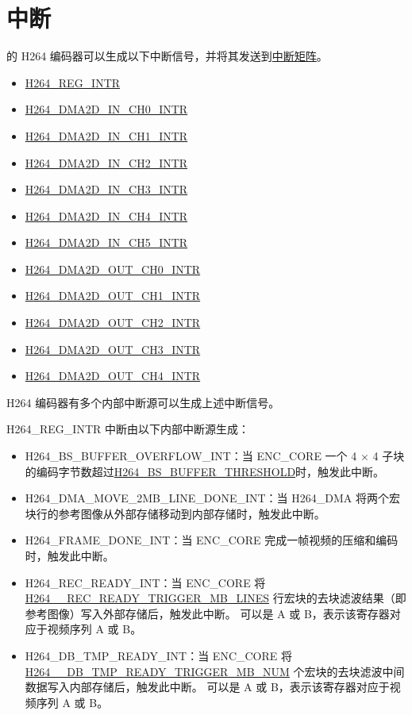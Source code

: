 \documentclass[main\_\_CN.tex]{subfiles}
\begin{document}
\section{中断}
\label{sec:h264enc-interrupt}
\chipname{} 的 H264 编码器可以生成以下中断信号，并将其发送到\hyperref[mod:intmtrx]{中断矩阵}。
    \begin{itemize}
        \item \hyperref[int:H264REGINT]{H264\_REG\_INTR}
        \item \hyperref[int:H264DMAINCHNINT]{H264\_DMA2D\_IN\_CH0\_INTR}
        \item \hyperref[int:H264DMAINCHNINT]{H264\_DMA2D\_IN\_CH1\_INTR}
        \item \hyperref[int:H264DMAINCHNINT]{H264\_DMA2D\_IN\_CH2\_INTR}
        \item \hyperref[int:H264DMAINCHNINT]{H264\_DMA2D\_IN\_CH3\_INTR}
        \item \hyperref[int:H264DMAINCHNINT]{H264\_DMA2D\_IN\_CH4\_INTR}
        \item \hyperref[int:H264DMAINCHNINT]{H264\_DMA2D\_IN\_CH5\_INTR}
        \item \hyperref[int:H264DMAOUTCHNINT]{H264\_DMA2D\_OUT\_CH0\_INTR}
        \item \hyperref[int:H264DMAOUTCHNINT]{H264\_DMA2D\_OUT\_CH1\_INTR}
        \item \hyperref[int:H264DMAOUTCHNINT]{H264\_DMA2D\_OUT\_CH2\_INTR}
        \item \hyperref[int:H264DMAOUTCHNINT]{H264\_DMA2D\_OUT\_CH3\_INTR}
        \item \hyperref[int:H264DMAOUTCHNINT]{H264\_DMA2D\_OUT\_CH4\_INTR}
    \end{itemize}

H264 编码器有多个内部中断源可以生成上述中断信号。

\label{int:H264REGINT}H264\_REG\_INTR 中断由以下内部中断源生成：
\begin{itemize}
\item \label{int:H264BSBUFFEROVERFLOWINT}H264\_BS\_BUFFER\_OVERFLOW\_INT：当 ENC\_CORE 一个 4 × 4 子块的编码字节数超过\hyperref[fielddesc:H264BSBUFFERTHRESHOLD]{H264\_BS\_BUFFER\_THRESHOLD}时，触发此中断。
\item \label{int:H264DMAMOVE2MBLINEDONEINT}H264\_DMA\_MOVE\_2MB\_LINE\_DONE\_INT：当 H264\_DMA 将两个宏块行的参考图像从外部存储移动到内部存储时，触发此中断。
\item \label{int:H264FRAMEDONEINT}H264\_FRAME\_DONE\_INT：当 ENC\_CORE 完成一帧视频的压缩和编码时，触发此中断。
\item \label{int:H264RECREADYINT}H264\_REC\_READY\_INT：当 ENC\_CORE 将 \hyperref[fielddesc:H264ARECREADYTRIGGERMBLINES]{H264\_\_REC\_READY\_TRIGGER\_MB\_LINES} 行宏块的去块滤波结果（即参考图像）写入外部存储后，触发此中断。 可以是 A 或 B，表示该寄存器对应于视频序列 A 或 B。
\item \label{int:H264DBTMPREADYINT}H264\_DB\_TMP\_READY\_INT：当 ENC\_CORE 将 \hyperref[fielddesc:H264ADBTMPREADYTRIGGERMBNUM]{H264\_\_DB\_TMP\_READY\_TRIGGER\_MB\_NUM} 个宏块的去块滤波中间数据写入内部存储后，触发此中断。 可以是 A 或 B，表示该寄存器对应于视频序列 A 或 B。
\end{itemize}
\end{document}
